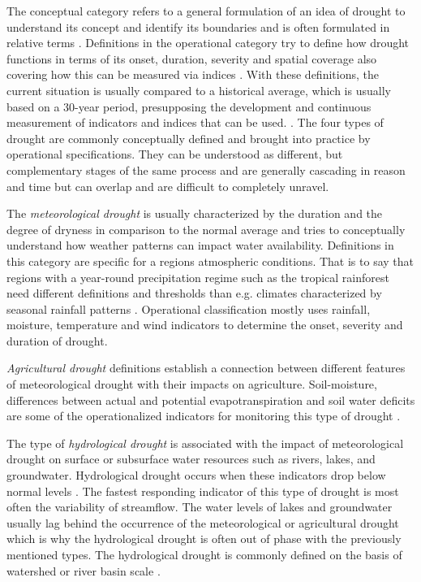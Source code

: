 The conceptual category refers to a general formulation of an idea of drought to understand its concept and identify its boundaries and is often formulated in relative terms \autocite{wilhiteUnderstandingDroughtPhenomenon1985}. Definitions in the operational category try to define how drought functions in terms of its onset, duration, severity and spatial coverage also covering how this can be measured via indices \autocite{balintMonitoringDroughtCombined2013, ndmcWhatDrought2023, wilhiteUnderstandingDroughtPhenomenon1985}. With these definitions, the current situation is usually compared to a historical average, which is usually based on a 30-year period, presupposing the development and continuous measurement of indicators and indices that can be used. \autocite{vereintenationenSpecialReportDrought2021,wilhiteUnderstandingDroughtPhenomenon1985}.
The four types of drought are commonly conceptually defined and brought into practice by operational specifications. They can be understood as different, but complementary stages of the same process and are generally cascading in reason and time but can overlap and are difficult to completely unravel. 

The \textit{meteorological drought} is usually characterized by the duration and the degree of dryness in comparison to the normal average and tries to conceptually understand how weather patterns can impact water availability. Definitions in this category are specific for a regions atmospheric conditions. That is to say that regions with a year-round precipitation regime such as the tropical rainforest need different definitions and thresholds than e.g. climates characterized by seasonal rainfall patterns \autocite{ndmcTypesDrought2023}. Operational classification mostly uses rainfall, moisture, temperature and wind indicators to determine the onset, severity and duration of drought.

\textit{Agricultural drought} definitions establish a connection between different features of meteorological drought with their impacts on agriculture. Soil-moisture, differences between actual and potential evapotranspiration and soil water deficits are some of the operationalized indicators for monitoring this type of drought \autocite{baltiReviewDroughtMonitoring2020,ndmcTypesDrought2023}.

The type of \textit{hydrological drought} is associated with the impact of meteorological drought on surface or subsurface water resources such as rivers, lakes, and groundwater. Hydrological drought occurs when these indicators drop below normal levels \autocite{palmerMeteorologicalDrought1965}. The fastest responding indicator of this type of drought is most often the variability of streamflow. The water levels of lakes and groundwater usually lag behind the occurrence of the meteorological or agricultural drought which is why the hydrological drought is often out of phase with the previously mentioned types. The hydrological drought is commonly defined on the basis of watershed or river basin scale \autocite{baltiReviewDroughtMonitoring2020,ndmcTypesDrought2023,wilhiteUnderstandingDroughtPhenomenon1985}.

